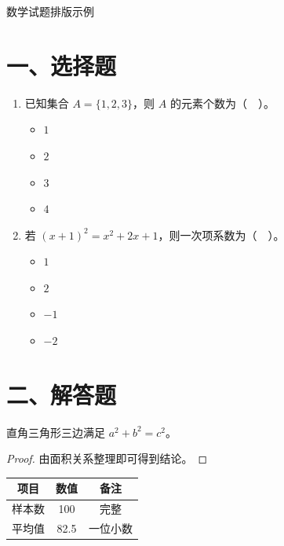 \documentclass{article}
\begin{document}
\begin{center}
\Large{数学试题排版示例}
\end{center}

\section*{一、选择题}
\begin{enumerate}
\item 已知集合 $A=\{1,2,3\}$，则 $A$ 的元素个数为（　）。
\begin{itemize}
\item[A.] $1$
\item[B.] $2$
\item[C.] $3$
\item[D.] $4$
\end{itemize}

\item 若 $(x+1)^2=x^2+2x+1$，则一次项系数为（　）。
\begin{itemize}
\item[A.] $1$
\item[B.] $2$
\item[C.] $-1$
\item[D.] $-2$
\end{itemize}
\end{enumerate}

\section*{二、解答题}
\begin{theorem}[勾股定理]
直角三角形三边满足 $a^2+b^2=c^2$。
\end{theorem}

\begin{proof}
由面积关系整理即可得到结论。
\end{proof}

\begin{longtable}{ccc}
\toprule
项目 & 数值 & 备注 \\
\midrule
样本数 & 100 & 完整 \\
平均值 & 82.5 & 一位小数 \\
\bottomrule
\end{longtable}
\end{document}

